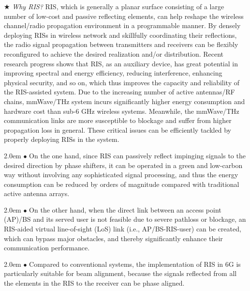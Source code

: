 \documentclass[journal,comsoc]{IEEEtran}
\begin{document}
$\bigstar$ \emph{Why RIS?} RIS, which is generally a planar surface consisting of a large number of low-cost and passive reflecting elements, can help reshape the wireless channel/radio propagation environment in a programmable manner. By densely deploying RISs in wireless network and skillfully coordinating their reflections, the radio signal propagation between transmitters and receivers can be flexibly reconfigured to achieve the desired realization and/or distribution. Recent research progress shows that RIS, as an auxiliary device, has great potential in improving spectral and energy efficiency, reducing interference, enhancing physical security, and so on, which thus improves the capacity and reliability of the RIS-assisted system. Due to the increasing number of active antennas/RF chains, mmWave/THz system incurs significantly higher energy consumption and hardware cost than sub-6 GHz wireless systems. Meanwhile, the mmWave/THz communication links are more susceptible to blockage and suffer from higher propagation loss in general. These critical issues can be efficiently tackled by properly deploying RISs in the system.

\hangindent 2.0em
$\bullet$ On the one hand, since RIS can passively reflect impinging signals to the desired direction by phase shifters, it can be operated in a green and low-carbon way without involving any sophisticated signal processing, and thus the energy consumption can be reduced by orders of magnitude compared with traditional active antenna arrays.

\hangindent 2.0em
$\bullet$ On the other hand, when the direct link between an access point (AP)/BS and its served user is not feasible due to severe pathloss or blockage, an RIS-aided virtual line-of-sight (LoS) link (i.e., AP/BS-RIS-user) can be created, which can bypass major obstacles, and thereby significantly enhance their communication performance.

\hangindent 2.0em
$\bullet$ Compared to conventional systems, the implementation of RIS in 6G is particularly suitable for beam alignment, because the signals reflected from all the elements in the RIS to the receiver can be phase aligned.
\end{document}
